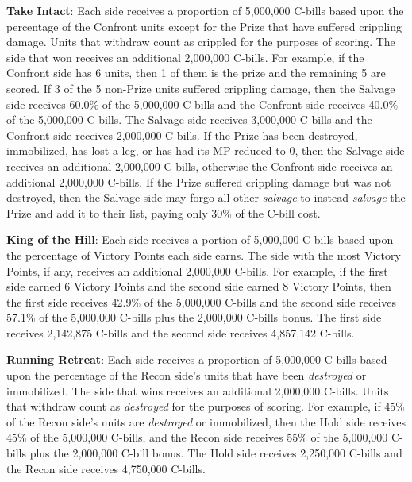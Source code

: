 \begin{description}
\item {\bfseries Take Intact}: Each side receives a proportion of 5,000,000 C-bills based upon the percentage of the Confront units except for the Prize that have suffered crippling damage.
Units that withdraw count as crippled for the purposes of scoring.
The side that won receives an additional 2,000,000 C-bills.
For example, if the Confront side has 6 units, then 1 of them is the prize and the remaining 5 are scored.
If 3 of the 5 non-Prize units suffered crippling damage, then the Salvage side receives 60.0\% of the 5,000,000 C-bills and the Confront side receives 40.0\% of the 5,000,000 C-bills.
The Salvage side receives 3,000,000 C-bills and the Confront side receives 2,000,000 C-bills.
If the Prize has been destroyed, immobilized, has lost a leg, or has had its MP reduced to 0, then the Salvage side receives an additional 2,000,000 C-bills, otherwise the Confront side receives an additional 2,000,000 C-bills.
If the Prize suffered crippling damage but was not destroyed, then the Salvage side may forgo all other \emph{salvage} to instead \emph{salvage} the Prize and add it to their list, paying only 30\% of the C-bill cost.

\item {\bfseries King of the Hill}: Each side receives a portion of 5,000,000 C-bills based upon the percentage of Victory Points each side earns.
The side with the most Victory Points, if any, receives an additional 2,000,000 C-bills.
For example, if the first side earned 6 Victory Points and the second side earned 8 Victory Points, then the first side receives 42.9\% of the 5,000,000 C-bills and the second side receives 57.1\% of the 5,000,000 C-bills plus the 2,000,000 C-bills bonus.
The first side receives 2,142,875 C-bills and the second side receives 4,857,142 C-bills.

\item {\bfseries Running Retreat}: Each side receives a proportion of 5,000,000 C-bills based upon the percentage of the Recon side's units that have been \emph{destroyed} or immobilized.
The side that wins receives an additional 2,000,000 C-bills.
Units that withdraw count as \emph{destroyed} for the purposes of scoring.
For example, if 45\% of the Recon side's units are \emph{destroyed} or immobilized, then the Hold side receives 45\% of the 5,000,000 C-bills, and the Recon side receives 55\% of the 5,000,000 C-bills plus the 2,000,000 C-bill bonus.
The Hold side receives 2,250,000 C-bills and the Recon side receives 4,750,000 C-bills.


\end{description}
